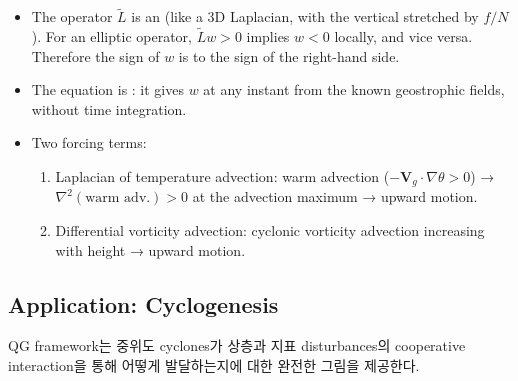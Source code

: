 \begin{remark}
\begin{itemize}
  \item The operator $\tilde{L}$ is an  (like a 3D
        Laplacian, with the vertical stretched by $f/N$).  For an elliptic
        operator, $\tilde{L}w > 0$ implies $w < 0$ locally, and vice versa.
        Therefore the sign of $w$ is  to the sign of the
        right-hand side.
  \item The equation is : it gives $w$ at any instant from
        the known geostrophic fields, without time integration.
  \item Two forcing terms:
    \begin{enumerate}
      \item Laplacian of temperature advection: warm advection
            ($-\mathbf{V}_g\cdot\nabla\theta > 0$) → $\nabla^2(\text{warm adv.}) > 0$
            at the advection maximum → upward motion.
      \item Differential vorticity advection: cyclonic vorticity advection
            increasing with height → upward motion.
    \end{enumerate}
\end{itemize}
\end{remark}


\subsection{Application: Cyclogenesis}\label{subsec:cyclogenesis}

QG framework는 중위도 cyclones가 상층과 지표 disturbances의
cooperative interaction을 통해 어떻게 발달하는지에 대한 완전한 그림을 제공한다.

